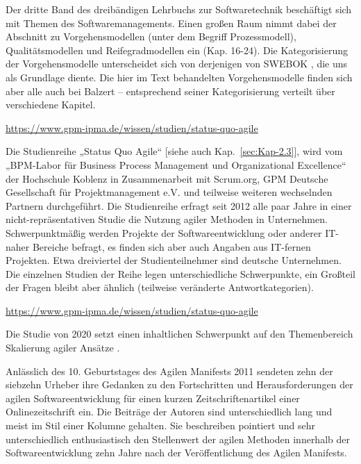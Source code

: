 {Der dritte Band des dreibändigen Lehrbuchs zur Softwaretechnik beschäftigt sich mit Themen des Softwaremanagements. Einen großen Raum nimmt dabei der Abschnitt zu Vorgehensmodellen (unter dem Begriff Prozessmodell), Qualitätsmodellen und Reifegradmodellen ein (Kap. 16-24). Die Kategorisierung der Vorgehensmodelle unterscheidet sich von derjenigen von SWEBOK \cite{swe14}, die uns als Grundlage diente. Die hier im Text behandelten Vorgehensmodelle finden sich aber alle auch bei Balzert – entsprechend seiner Kategorisierung verteilt über verschiedene Kapitel.}

{\href{https://www.gpm-ipma.de/wissen/studien/status-quo-agile}{https://www.gpm-ipma.de/wissen/studien/status-quo-agile}

Die Studienreihe „Status Quo Agile“ [siehe auch Kap.~\ref{sec:Kap-2.3}], wird vom „BPM-Labor für Business Process Management und Organizational Excellence“ der Hochschule Koblenz in Zusammenarbeit mit Scrum.org, GPM Deutsche Gesellschaft für Projektmanagement e.V. und teilweise weiteren wechselnden Partnern durchgeführt. Die Studienreihe erfragt seit 2012 alle paar Jahre in einer nicht-repräsentativen Studie die Nutzung agiler Methoden in Unternehmen. Schwerpunktmäßig werden Projekte der Softwareentwicklung oder anderer IT-naher Bereiche befragt, es finden sich aber auch Angaben aus IT-fernen Projekten. Etwa dreiviertel der Studienteilnehmer sind deutsche Unternehmen. Die einzelnen Studien der Reihe legen unterschiedliche Schwerpunkte, ein Großteil der Fragen bleibt aber ähnlich (teilweise veränderte Antwortkategorien).}

{\href{https://www.gpm-ipma.de/wissen/studien/status-quo-agile}{https://www.gpm-ipma.de/wissen/studien/status-quo-agile}

Die Studie von 2020 setzt einen inhaltlichen Schwerpunkt auf den Themenbereich Skalierung agiler Ansätze  \cite[95 \psqq]{kom20}.}

{Anlässlich des 10. Geburtstages des Agilen Manifests 2011 sendeten zehn der siebzehn Urheber ihre Gedanken zu den Fortschritten und Herausforderungen der agilen Softwareentwicklung für einen kurzen Zeitschriftenartikel einer Onlinezeitschrift ein. Die Beiträge der Autoren sind unterschiedlich lang und meist im Stil einer Kolumne gehalten. Sie beschreiben pointiert und sehr unterschiedlich enthusiastisch den Stellenwert der agilen Methoden innerhalb der Softwareentwicklung zehn Jahre nach der Veröffentlichung des Agilen Manifests.}

